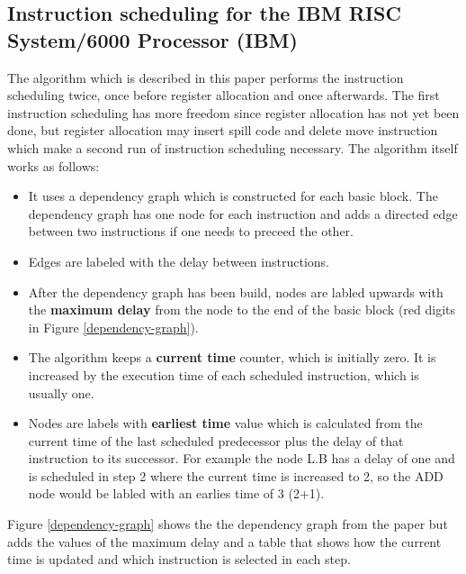 \documentclass[a4paper,10pt]{article}
\begin{document}
\subsection{Instruction scheduling for the IBM RISC System/6000 Processor (IBM)}
The algorithm which is described in this paper performs the instruction scheduling twice, once before register allocation and once
afterwards. The first instruction scheduling has more freedom since register allocation has not yet been done, but register allocation
may insert spill code and delete move instruction which make a second run of instruction scheduling necessary. The algorithm itself works
as follows:
\begin{itemize}
 \item It uses a dependency graph which is constructed for each basic block. The dependency graph has one node for each instruction and
       adds a directed edge between two instructions if one needs to preceed the other.
 \item Edges are labeled with the delay between instructions.
 \item After the dependency graph has been build, nodes are labled upwards with the \textbf{maximum delay} from the node to the end of 
       the basic block (red digits in Figure \ref{dependency-graph}).
 \item The algorithm keeps a \textbf{current time} counter, which is initially zero. It is increased by the execution time of each 
       scheduled instruction, which is usually one.
 \item Nodes are labels with \textbf{earliest time} value which is calculated from the current time of the last scheduled predecessor 
       plus the delay of that instruction to its successor. For example the node L.B has a delay of one and is scheduled in step 2 where 
       the current time is increased to 2, so the ADD node would be labled with an earlies time of 3 (2+1).
\end{itemize}

Figure \ref{dependency-graph} shows the the dependency graph from the paper but adds the values of the maximum delay and a table that 
shows how the current time is updated and which instruction is selected in each step.
\end{document}
